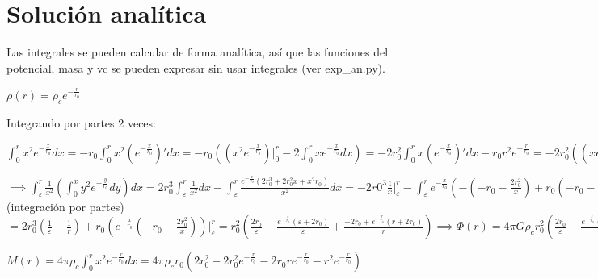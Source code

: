 \documentclass[12pt]{book}
\begin{document}
\section*{Solución analítica}
\begin{description}
\item Las integrales se pueden calcular de forma analítica, así que las funciones del potencial, masa y vc se pueden expresar sin usar integrales (ver exp\_an.py).

\item  $\rho(r) =  \rho_c  e^{-\frac{r}{r_0}} $  
\item Integrando por partes 2 veces:
\item $\int_0^r{x^2 e^{-\frac{x}{r_0}}dx} = - r_0 \int_0^r{x^2 (e^{-\frac{x}{r_0}})\prime dx}
=-r_0( (x^2 e^{-\frac{x}{r_0}})\Big|_0^r  - 2\int_0^r{x e^{-\frac{x}{r_0}}dx})  = 
-2 r_0^2 \int_0^r{x (e^{-\frac{x}{r_0}})\prime dx} - r_0 r^2 e^{-\frac{r}{r_0}} = -2 r_0^2 ((x e^{-\frac{x}{r_0}})\Big|_0^r - \int_0^r{e^{-\frac{x}{r_0}}dx}) - r_0 r^2 e^{-\frac{r}{r_0}} = 
-2 r_0^3 e^{-\frac{x}{r_0}}\Big|_0^r -2 r_0^2 r e^{-\frac{r}{r_0}} - r_0 r^2 e^{-\frac{r}{r_0}} = 
2 r_0^3 -2 r_0^3 e^{-\frac{r}{r_0}} -2 r_0^2 r e^{-\frac{r}{r_0}} - r_0 r^2 e^{-\frac{r}{r_0}}  
= 2  r_0^3 -  r_0 e^{-\frac{r}{r_0}} (2 r_0^2  + 2 r_0 r + r^2)
$

\item $\implies \int_\varepsilon^r{ \frac{1}{x^2}(\int_0^x{y^2 e^{-\frac{y}{r_0}}dy})dx} = 
2 r_0^3 \int_\varepsilon^r{\frac{1}{x^2}dx} - \int_\varepsilon^r{\frac{ e^{-\frac{x}{r_0}} (2 r_0^3 + 2 r_0^2 x +x^2 r_0)}{x^2}dx }=
-2 r0^3 \frac{1}{x}\Big|_\varepsilon^r -  \int_\varepsilon^r{e^{-\frac{x}{r_0}} (- (-r_0 - \frac{2 r_0^2}{x}) + r_0 (-r_0 - \frac{2 r_0^2}{x})\prime) dx } = 
2 r_0^3 (\frac{1}{\varepsilon} - \frac{1}{r}) + r_0 ((e^{-\frac{x}{r_0}})\prime (-r_0 - \frac{2 r_0^2}{x})  + e^{-\frac{x}{r_0}} (-r_0 - \frac{2 r_0^2}{x})\prime )= $(integración por partes)$
=2 r_0^3 (\frac{1}{\varepsilon} - \frac{1}{r}) + r_0 (e^{-\frac{x}{r_0}} (-r_0 - \frac{2 r_0^2}{x})) \Big|_\varepsilon^r =
 r_0^2 (\frac{2 r_0}{\varepsilon} - \frac{e^{-\frac{\varepsilon}{r_0}}(\varepsilon + 2 r_0)  }{\varepsilon} + \frac{-2 r_0 + e^{-\frac{r}{r_0}} (r + 2 r_0) }{r} )
\implies \Phi(r) = 4 \pi G \rho_c r_0^2 (\frac{2 r_0}{\varepsilon} - \frac{e^{-\frac{\varepsilon}{r_0}}(\varepsilon + 2 r_0)  }{\varepsilon}
+ \frac{-2 r_0 + e^{-\frac{r}{r_0}} (r + 2 r_0) }{r} )$

\item $M(r) = 4 \pi \rho_c \int_0^r{x^2 e^{-\frac{x}{r_0}}dx} = 4 \pi \rho_c r_0 ( 2 r_0^2 - 2 r_0^2 e^{-\frac{r}{r_0}} - 2 r_0 r e^{-\frac{r}{r_0}} - r^2 e^{-\frac{r}{r_0}}) $


\end{description}
\end{document}
